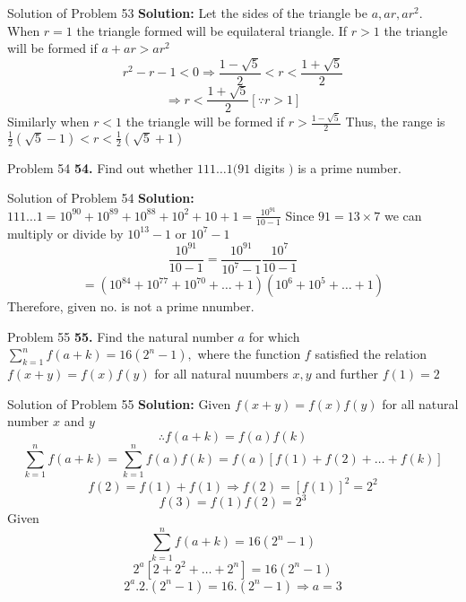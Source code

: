 \documentclass[aspectratio=1610,8pt]{beamer}
\begin{document}
\begin{frame}{Solution of Problem 53}
  \textbf{Solution:} Let the sides of the triangle be $a, ar, ar^2.$
  \linebreak\linebreak
  When $r = 1$ the triangle formed will be equilateral triangle.
  \linebreak\linebreak
  If $r > 1$ the triangle will be formed if $a + ar > ar^2$
  $$r^2 - r - 1 < 0\Rightarrow \frac{1 - \sqrt{5}}{2} < r <\frac{1 + \sqrt{5}}{2}$$
  $$\Rightarrow r < \frac{1 + \sqrt{5}}{2}[\because r > 1]$$
  Similarly when $r < 1$ the triangle will be formed if $r > \frac{1 - \sqrt{5}}{2}$
  \linebreak\linebreak
  Thus, the range is $\frac{1}{2}(\sqrt{5} - 1) < r < \frac{1}{2}(\sqrt{5} + 1)$
\end{frame}
\begin{frame}{Problem 54}
  \textbf{54.} Find out whether $111\ldots1( 91$ digits $)$ is a prime number.
\end{frame}
\begin{frame}{Solution of Problem 54}
  \textbf{Solution:} $111\ldots 1 = 10^{90} + 10^{89} + 10^{88} + 10^2 + 10 + 1 = \frac{10^{91}}{10 - 1}$
  Since $91 = 13\times 7$ we can multiply or divide by $10^{13} - 1$ or $10^7 - 1$
  $$\frac{10^{91}}{10 - 1} = \frac{10^{91}}{10^7 - 1}\frac{10^{7}}{10 - 1}$$
  $$= (10^{84} + 10^{77} + 10^{70} + \ldots + 1)(10^6 + 10^5 + \ldots + 1)$$
  Therefore, given no. is not a prime nnumber.
\end{frame}
\begin{frame}{Problem 55}
  \textbf{55.} Find the natural number $a$ for which $\sum_{k = 1}^nf(a + k) = 16(2^n - 1),$ where the function $f$ satisfied the
  relation $f(x + y) = f(x)f(y)$ for all natural nuumbers $x, y$ and further $f(1) = 2$
\end{frame}
\begin{frame}{Solution of Problem 55}
  \textbf{Solution:} Given $f(x + y) = f(x)f(y)$ for all natural number $x$ and $y$
  \linebreak\linebreak
  $$\therefore f(a + k) = f(a)f(k)$$
  $$\sum_{k = 1}^nf(a + k) = \sum_{k = 1}^nf(a)f(k) = f(a)[f(1) + f(2) + \ldots + f(k)]$$
  $$f(2) = f(1) + f(1) \Rightarrow f(2) = [f(1)]^2 = 2^2$$
  $$f(3) = f(1)f(2)= 2^3$$
  Given $$\sum_{k = 1}^nf(a + k) = 16(2^n - 1)$$
  $$2^a[2 + 2^2 + \ldots + 2^n] = 16(2^n - 1)$$
  $$2^a.2.(2^n - 1) = 16.(2^n - 1)\Rightarrow a = 3$$
\end{frame}
\end{document}
